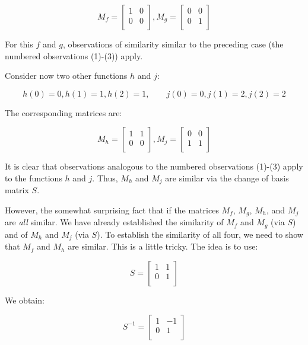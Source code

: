\documentclass[10pt]{amsart}
\begin{document}
$$M_f = \left[\begin{matrix} 1 & 0 \\ 0 & 0 \\\end{matrix}\right], M_g = \left[\begin{matrix} 0 & 0 \\ 0 & 1 \\\end{matrix}\right]$$

For this $f$ and $g$, observations of similarity similar to the
preceding case (the numbered observations (1)-(3)) apply.

Consider now two other functions $h$ and $j$:

$$h(0) = 0, h(1) = 1, h(2) = 1, \qquad j(0) = 0, j(1) = 2, j(2) = 2$$

The corresponding matrices are:

$$M_h = \left[\begin{matrix} 1 & 1 \\ 0 & 0 \\\end{matrix}\right], M_j = \left[\begin{matrix} 0 & 0 \\ 1 & 1 \\\end{matrix}\right]$$

It is clear that observations analogous to the numbered observations
(1)-(3) apply to the functions $h$ and $j$. Thus, $M_h$ and $M_j$ are
similar via the change of basis matrix $S$.

However, the somewhat surprising fact that if the matrices $M_f$,
$M_g$, $M_h$, and $M_j$ are {\em all} similar. We have already
established the similarity of $M_f$ and $M_g$ (via $S$) and of $M_h$
and $M_j$ (via $S$). To establish the similarity of all four, we need
to show that $M_f$ and $M_h$ are similar. This is a little tricky. The
idea is to use:

$$S = \left[\begin{matrix} 1 & 1 \\ 0 & 1 \\\end{matrix}\right]$$

We obtain:

$$S^{-1} = \left[\begin{matrix} 1 & -1 \\ 0 & 1 \\\end{matrix}\right]$$
\end{document}
